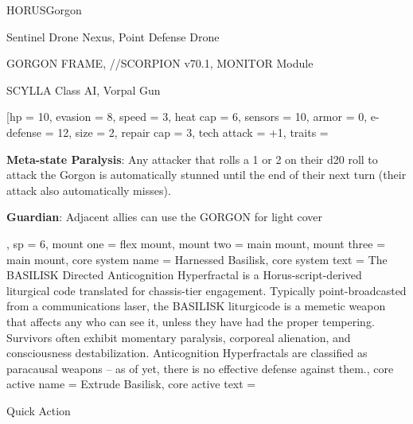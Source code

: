 

\begin{mech}{HORUS}{Gorgon}


\begin{license}
\item Sentinel Drone Nexus, Point Defense Drone
\item GORGON FRAME,  //SCORPION v70.1, MONITOR Module
\item SCYLLA Class AI, Vorpal Gun
\end{license}


\frameBox
[hp = 10,
evasion = 8,
speed = 3,
heat cap = 6,
sensors = 10,
armor = 0,
e-defense = 12,
size = 2,
repair cap = 3,
tech attack = +1,
traits = {
     \textbf{Meta-state Paralysis}: Any attacker that rolls a 1 or 2 on their d20 roll to attack the Gorgon is automatically stunned until the end of their next turn (their attack also automatically misses).

     \textbf{Guardian}: Adjacent allies can use the GORGON for light cover
     },
sp = 6,
mount one = flex mount,
mount two = main mount,
mount three = main mount,
core system name = Harnessed Basilisk,
core system text = {The BASILISK Directed Anticognition Hyperfractal is a Horus-script-derived liturgical code translated for chassis-tier engagement. Typically point-broadcasted from a communications laser, the BASILISK liturgicode is a memetic weapon that affects any who can see it, unless they have had the proper tempering. Survivors often exhibit momentary paralysis, corporeal alienation, and consciousness destabilization. Anticognition Hyperfractals are classified as paracausal weapons -- as of yet, there is no effective defense against them.},
core active name = Extrude Basilisk,
core active text = {Quick Action

}
\end{mech}
